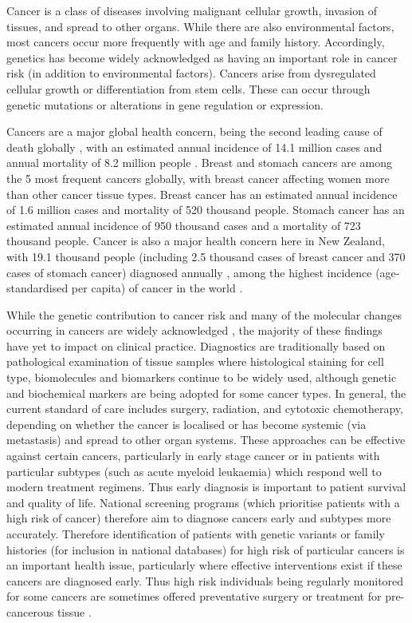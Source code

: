 Cancer is a class of diseases involving malignant cellular growth, invasion of tissues, and spread to other organs. While there are also environmental factors, most cancers occur more frequently with age and family history. Accordingly, genetics has become widely acknowledged as having an important role in cancer risk (in addition to environmental factors). Cancers arise from dysregulated cellular growth or differentiation from stem cells. These can occur through genetic mutations or alterations in gene regulation or expression.

Cancers are a major global health concern, being the second leading cause of death globally \citep{WorldHealthOrg2017}, with an estimated annual incidence of 14.1 million cases and annual mortality of 8.2 million people \citep{Ferlay2015}. Breast and stomach cancers are among the 5 most frequent cancers globally, with breast cancer affecting women more than other cancer tissue types. Breast cancer has an estimated annual incidence of 1.6 million cases and mortality of 520 thousand people. Stomach cancer has an estimated annual incidence of 950 thousand cases and a mortality of 723 thousand people. Cancer is also a major health concern here in New Zealand, with 19.1 thousand people (including 2.5 thousand cases of breast cancer and 370 cases of stomach cancer) diagnosed annually \citep{CIX2013}, among the highest incidence (age-standardised per capita) of cancer in the world \citep{Ferlay2015}.   

While the genetic contribution to cancer risk and many of the molecular changes occurring in cancers are widely acknowledged \citep{CancerResearchUK2017, ASCO2017, CSNZ2017}, the majority of these findings have yet to impact on clinical practice. Diagnostics are traditionally based on pathological examination of tissue samples where histological staining for cell type, biomolecules and biomarkers continue to be widely used, although genetic and biochemical markers are being adopted for some cancer types. In general, the current standard of care includes surgery, radiation, and cytotoxic chemotherapy, depending on whether the cancer is localised or has become systemic (via metastasis) and spread to other organ systems. These approaches can be effective against certain cancers, particularly in early stage cancer or in patients with particular subtypes (such as acute myeloid leukaemia) which respond well to modern treatment regimens. Thus early diagnosis is important to patient survival and quality of life. National screening programs (which prioritise patients with a high risk of cancer) therefore aim to diagnose cancers early and subtypes more accurately. Therefore identification of patients with genetic variants or family histories (for inclusion in national databases) for high risk of particular cancers is an important health issue, particularly where effective interventions exist if these cancers are diagnosed early. Thus high risk individuals being regularly monitored for some cancers are sometimes offered preventative surgery or treatment for pre-cancerous tissue \citep{Guilford2010, Scheuer2002}. 

